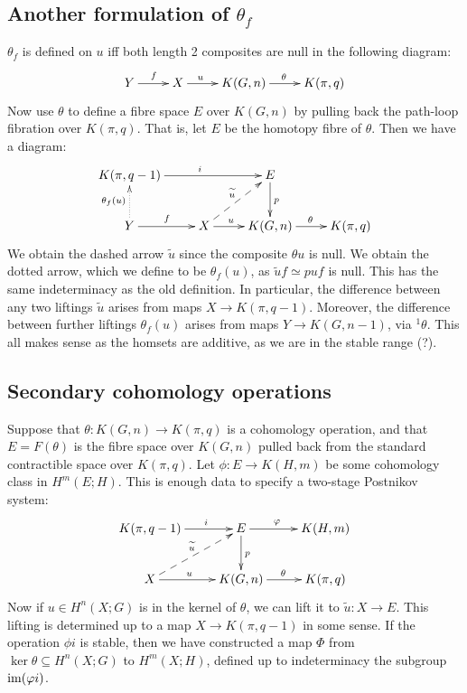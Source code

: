 \documentclass[11pt]{article}
\begin{document}
\subsection{Another formulation of \texorpdfstring{$\theta_f$}{theta f}}
$\theta_f$ is defined on $u$ iff both length 2 composites are null in the
following diagram:
\[\xymatrix{
Y\ar[r]^f&X\ar[r]^{u\ \ \ \ \ }&K(G,n)\ar[r]^\theta&K(\pi,q)
}\]
Now use $\theta$ to define a fibre space $E$ over $K(G,n)$ by pulling back the
path-loop fibration over $K(\pi,q)$. That is, let $E$ be the homotopy fibre of
$\theta$. Then we have a diagram:
\[\xymatrix{
K(\pi,q-1)\ar[rr]^i&&E\ar[d]^p\\
Y\ar[r]^f\ar@{.>}[u]^{\theta_f(u)}&
X\ar[r]^{u\ \ \ }\ar@{-->}[ru]^{\widetilde u}&
K(G,n)\ar[r]^\theta&K(\pi,q)
}\]
We obtain the dashed arrow $\widetilde u$ since the composite $\theta u$ is
null. We obtain the dotted arrow, which we define to be $\theta_f(u)$, as
$\widetilde u f\simeq puf$ is null. This has the same indeterminacy as the old
definition. In particular, the difference between any two liftings
$\widetilde u$ arises from maps $X\to K(\pi,q-1)$. Moreover, the difference
between further liftings $\theta_f(u)$ arises from maps 
$Y\to K(G,n-1)$, via $^1\theta$. This all makes sense as the homsets are
additive, as we are in the stable range (?).
\subsection{Secondary cohomology operations}
Suppose that $\theta:K(G,n)\to K(\pi,q)$ is a cohomology operation, and that
$E=F(\theta)$ is the fibre space over $K(G,n)$ pulled back from the standard
contractible space over $K(\pi,q)$. Let $\phi:E\to K(H,m)$ be some cohomology
class in $H^m(E;H)$. This is enough data to specify a two-stage Postnikov
system:
\[\xymatrix{
K(\pi,q-1)\ar[r]^{\ \ \ \ \ i}&E\ar[r]^{\phi\ \ \ }\ar[d]^p&K(H,m)\\
X\ar@{-->}[ru]^{\widetilde u}\ar[r]^{u\ \ \ }&K(G,n)\ar[r]^\theta&K(\pi,q)
}\]
Now if $u\in H^n(X;G)$ is in the kernel of $\theta$, we can lift it to
$\widetilde u:X\to E$. This lifting is determined up to a map $X\to K(\pi,q-1)$
in some sense. If the operation $\phi i$ is stable, then we have constructed a
map $\Phi$  from $\ker\theta\subseteq H^n(X;G)$ to $H^m(X;H)$, defined up to
indeterminacy the subgroup $\operatorname{im}(\varphi i)$.
\end{document}
